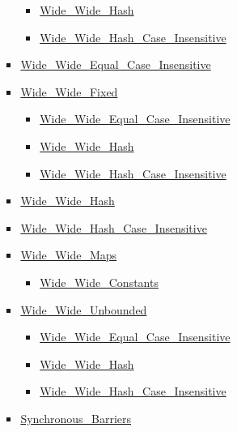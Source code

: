 \documentclass[english]{article}
\begin{document}
\begin{scriptsize}
\begin{multicols*}{5}
\begin{itemize}[leftmargin=0mm]
\begin{itemize}[leftmargin=5mm]
\begin{itemize}[leftmargin=5mm]
\begin{itemize}[leftmargin=5mm]
	  \item[] \href{http://www.ada-auth.org/standards/22rm/html/RM-A-4-8.html}{Wide\_Wide\_Hash}
	  \item[] \href{http://www.ada-auth.org/standards/22rm/html/RM-A-4-8.html}{Wide\_Wide\_Hash\_Case\_Insensitive}
	  \end{itemize}
	\item[] \href{http://www.ada-auth.org/standards/22rm/html/RM-A-4-8.html}{Wide\_Wide\_Equal\_Case\_Insensitive}
	\item[] \href{http://www.ada-auth.org/standards/22rm/html/RM-A-4-8.html}{Wide\_Wide\_Fixed}
	  \begin{itemize}[leftmargin=5mm]
	  \item[] \href{http://www.ada-auth.org/standards/22rm/html/RM-A-4-8.html}{Wide\_Wide\_Equal\_Case\_Insensitive}
	  \item[] \href{http://www.ada-auth.org/standards/22rm/html/RM-A-4-8.html}{Wide\_Wide\_Hash}
	  \item[] \href{http://www.ada-auth.org/standards/22rm/html/RM-A-4-8.html}{Wide\_Wide\_Hash\_Case\_Insensitive}
	  \end{itemize}
	\item[] \href{http://www.ada-auth.org/standards/22rm/html/RM-A-4-8.html}{Wide\_Wide\_Hash}
	\item[] \href{http://www.ada-auth.org/standards/22rm/html/RM-A-4-8.html}{Wide\_Wide\_Hash\_Case\_Insensitive}
	\item[] \href{http://www.ada-auth.org/standards/22rm/html/RM-A-4-8.html}{Wide\_Wide\_Maps}
	  \begin{itemize}[leftmargin=5mm]
	  \item[] \href{http://www.ada-auth.org/standards/22rm/html/RM-A-4-8.html}{Wide\_Wide\_Constants}
	  \end{itemize}
	\item[] \href{http://www.ada-auth.org/standards/22rm/html/RM-A-4-8.html}{Wide\_Wide\_Unbounded}
	  \begin{itemize}[leftmargin=5mm]
	  \item[] \href{http://www.ada-auth.org/standards/22rm/html/RM-A-4-8.html}{Wide\_Wide\_Equal\_Case\_Insensitive}
	  \item[] \href{http://www.ada-auth.org/standards/22rm/html/RM-A-4-8.html}{Wide\_Wide\_Hash}
	  \item[] \href{http://www.ada-auth.org/standards/22rm/html/RM-A-4-8.html}{Wide\_Wide\_Hash\_Case\_Insensitive}
	  \end{itemize}
	\item[] \href{http://www.ada-auth.org/standards/22rm/html/RM-D-10-1.html}{Synchronous\_Barriers}

\end{itemize}
\end{itemize}
\end{itemize}
\end{multicols*}
\end{scriptsize}
\end{document}
